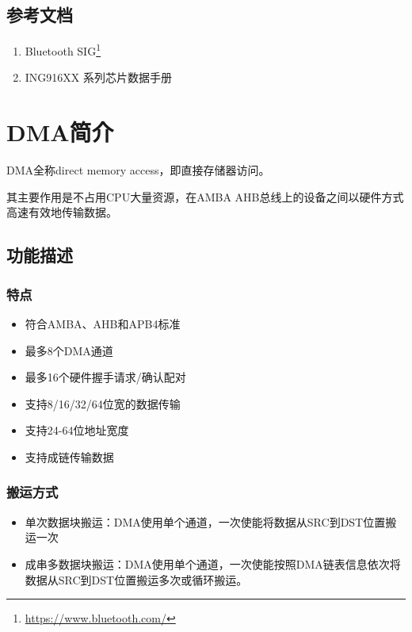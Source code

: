 \documentclass[
  12pt,
]{book}
\providecommand{\tightlist}{%
  \setlength{\itemsep}{0pt}\setlength{\parskip}{0pt}}
\begin{document}
\hypertarget{ux53c2ux8003ux6587ux6863}{%
\section{参考文档}\label{ux53c2ux8003ux6587ux6863}}

\begin{enumerate}
\def\labelenumi{\arabic{enumi}.}
\tightlist
\item
  Bluetooth SIG\footnote{\url{https://www.bluetooth.com/}}
\item
  ING916XX 系列芯片数据手册
\end{enumerate}

\hypertarget{ch-dma}{%
\chapter{DMA简介}\label{ch-dma}}

DMA全称direct memory access，即直接存储器访问。

其主要作用是不占用CPU大量资源，在AMBA AHB总线上的设备之间以硬件方式高速有效地传输数据。

\hypertarget{ux529fux80fdux63cfux8ff0}{%
\section{功能描述}\label{ux529fux80fdux63cfux8ff0}}

\hypertarget{ux7279ux70b9}{%
\subsection{特点}\label{ux7279ux70b9}}

\begin{itemize}
\item
  符合AMBA、AHB和APB4标准
\item
  最多8个DMA通道
\item
  最多16个硬件握手请求/确认配对
\item
  支持8/16/32/64位宽的数据传输
\item
  支持24-64位地址宽度
\item
  支持成链传输数据
\end{itemize}

\hypertarget{ux642cux8fd0ux65b9ux5f0f}{%
\subsection{搬运方式}\label{ux642cux8fd0ux65b9ux5f0f}}

\begin{itemize}
\item
  单次数据块搬运：DMA使用单个通道，一次使能将数据从SRC到DST位置搬运一次
\item
  成串多数据块搬运：DMA使用单个通道，一次使能按照DMA链表信息依次将数据从SRC到DST位置搬运多次或循环搬运。
\end{itemize}
\end{document}

